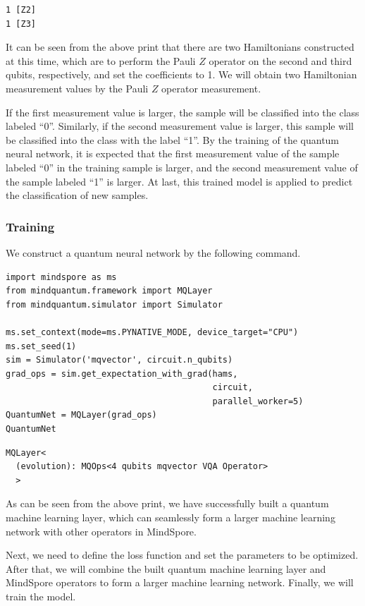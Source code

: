 \begin{lstlisting}
1 [Z2]
1 [Z3]
\end{lstlisting}

It can be seen from the above print that there are two Hamiltonians constructed at this time, which are to perform the Pauli $Z$ operator on the second and third qubits, respectively, and set the coefficients to 1. We will obtain two Hamiltonian measurement values by the Pauli $Z$ operator measurement.

If the first measurement value is larger, the sample will be classified into the class labeled ``0''.  Similarly, if the second measurement value is larger, this sample will be classified into the class with the label ``1''. By the training of the quantum neural network, it is expected that the first measurement value of the sample labeled ``0''  in the training sample is larger, and the second measurement value of the sample labeled ``1'' is larger. At last, this trained model is applied to predict the classification of new samples.

\subsubsection{Training}
We construct a quantum neural network by the following command.

\begin{lstlisting}
import mindspore as ms
from mindquantum.framework import MQLayer
from mindquantum.simulator import Simulator

ms.set_context(mode=ms.PYNATIVE_MODE, device_target="CPU")
ms.set_seed(1)
sim = Simulator('mqvector', circuit.n_qubits)
grad_ops = sim.get_expectation_with_grad(hams,
                                         circuit,
                                         parallel_worker=5)
QuantumNet = MQLayer(grad_ops)
QuantumNet
\end{lstlisting}

\begin{lstlisting}
MQLayer<
  (evolution): MQOps<4 qubits mqvector VQA Operator>
  >
\end{lstlisting}

As can be seen from the above print, we have successfully built a quantum machine learning layer, which can seamlessly form a larger machine learning network with other operators in MindSpore.

Next, we need to define the loss function and set the parameters to be optimized. After that, we will combine the built quantum machine learning layer and MindSpore operators to form a larger machine learning network. Finally, we will train the model. %


